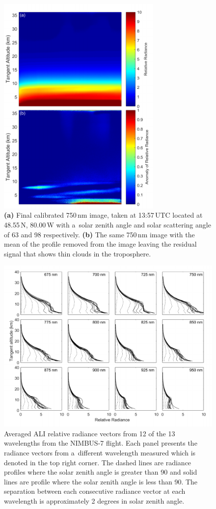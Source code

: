 \documentclass[amtd, online, hvmath]{copernicus}
\begin{document}
\begin{figure}
\includegraphics[height=110mm]{amt-2015-329-discussions-f09.pdf}
\caption{\textbf{(a)} Final calibrated 750\,\unit{nm} image, taken at
  13:57\,UTC located at 48.55{\degree}\,N, 80.00{\degree}\,W with
  a~solar zenith angle and solar scattering angle of 63 and
  98{\degree} respectively. \textbf{(b)} The same 750\,\unit{nm} image
  with the mean of the profile removed from the image leaving the
  residual signal that shows thin clouds in the troposphere.}
\label{amtd-2015-0329-f09.pdf}
\end{figure}

\begin{figure}
\includegraphics[width=120mm]{amt-2015-329-discussions-f10.pdf}
\caption{Averaged ALI relative radiance vectors from 12 of the 13
  wavelengths from the NIMBUS-7 flight. Each panel presents the
  radiance vectors from a~different wavelength measured which is
  denoted in the top right corner. The dashed lines are radiance
  profiles where the solar zenith angle is greater than 90{\degree}
  and solid lines are profile where the solar zenith angle is less
  than 90{\degree}. The separation between each consecutive radiance vector at each wavelength is approximately 2 degrees in solar zenith angle. }
\label{amtd-2015-0329-f10.pdf}
\end{figure}
\end{document}
